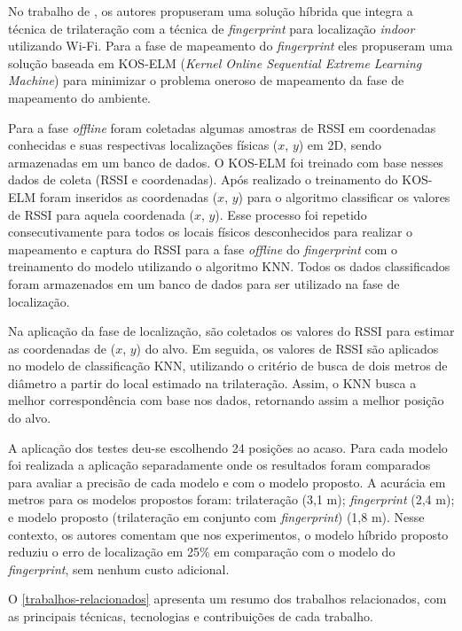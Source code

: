 \documentclass[12pt]{artigoifce}
\begin{document}
No trabalho de , os autores propuseram uma solução híbrida que integra a técnica de trilateração com a técnica de \textit{fingerprint} para localização \textit{indoor} utilizando Wi-Fi. Para a fase de mapeamento do \textit{fingerprint} eles propuseram uma solução baseada em KOS-ELM (\textit{Kernel Online Sequential Extreme Learning Machine}) para minimizar o problema oneroso de mapeamento da fase de mapeamento do ambiente.

Para a fase \textit{offline} foram coletadas algumas amostras de RSSI em coordenadas conhecidas e suas respectivas localizações físicas ($x$, $y$) em 2D, sendo armazenadas em um banco de dados. O KOS-ELM foi treinado com base nesses dados de coleta (RSSI e coordenadas). Após realizado o treinamento do KOS-ELM foram inseridos as coordenadas ($x$, $y$) para o algoritmo classificar os valores de RSSI para aquela coordenada ($x$, $y$). Esse processo foi repetido consecutivamente para todos os locais físicos desconhecidos para realizar o mapeamento e captura do RSSI para a fase \textit{offline} do \textit{fingerprint} com o treinamento do modelo utilizando o algoritmo KNN. Todos os dados classificados foram armazenados em um banco de dados para ser utilizado na fase de localização.

Na aplicação da fase de localização, são coletados os valores do RSSI para estimar as coordenadas de ($x$, $y$) do alvo. Em seguida, os valores de RSSI são aplicados no modelo de classificação KNN, utilizando o critério de busca de dois metros de diâmetro a partir do local estimado na trilateração. Assim, o KNN busca a melhor correspondência com base nos dados, retornando assim a melhor posição do alvo.

A aplicação dos testes deu-se escolhendo 24 posições ao acaso. Para cada modelo foi realizada a aplicação separadamente onde os resultados foram comparados para avaliar a precisão de cada modelo e com o modelo proposto. A acurácia em metros para os modelos propostos foram: trilateração (3,1 m); \textit{fingerprint} (2,4 m); e modelo proposto (trilateração em conjunto com \textit{fingerprint}) (1,8 m). Nesse contexto, os autores comentam que nos experimentos, o modelo híbrido proposto reduziu o erro de localização em 25\% em comparação com o modelo do \textit{fingerprint}, sem nenhum custo adicional.

\renewcommand{\tableautorefname}{Quadro}
\captionsetup[table]{name=Quadro}%

O \autoref{trabalhos-relacionados} apresenta um resumo dos trabalhos relacionados, com as principais técnicas, tecnologias e contribuições de cada trabalho. 
\end{document}

